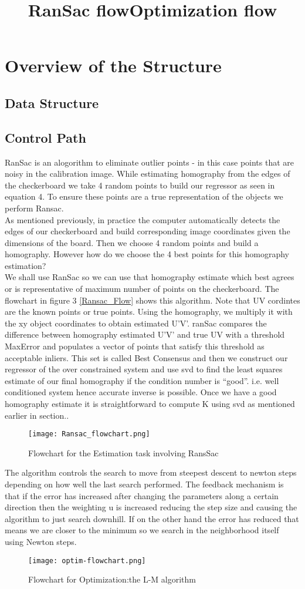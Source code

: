 \documentclass[titlepage]{article}
\begin{document}
\section{Overview of the Structure}
\subsection{Data Structure}
\subsection{Control Path}
\title{RanSac flow}
RanSac is an alogorithm to eliminate outlier points - in this case points that are noisy in the calibration image. While estimating homography from the edges of the checkerboard we take 4 random points to build our regressor \Phi as seen in equation 4. To ensure these points are a true representation of the objects we perform Ransac.\\
As mentioned previously, in practice the computer automatically detects the edges of our checkerboard and build corresponding image coordinates given the dimensions of the board.
Then we choose 4 random points and build a homography. However how do we choose the 4 best points for this homography estimation? \\
We shall use RanSac so we can use that homography estimate which best agrees or is representative of maximum number of points on the checkerboard. The flowchart in figure 3 \ref{Ransac_Flow} shows this algorithm. Note that UV cordintes are the known points or true points. Using the homography, we multiply it with the xy object coordinates to obtain estimated U’V’. ranSac compares the difference between homography estimated U’V’ and true UV with a threshold MaxError  and populates a vector of points that satisfy this threshold as acceptable inliers. This set is called Best Consensus and then we construct our regressor of the over constrained system and use svd to find the least squares estimate of our final homography if the condition number is “good”. i.e. well conditioned system hence accurate inverse is possible. Once we have a good homography estimate it is straightforward to compute K using svd as mentioned earlier in section..
\begin{wrapfigure}{r}{5.5cm}
  \label{Ransac_Flow}
  \caption{Flowchart for the Estimation task involving RansSac}\label{wrap-fig:1}
  \texttt{[image: Ransac\_flowchart.png]}
\end{wrapfigure} 
\title{Optimization flow}
The algorithm controls the search to move from steepest descent to newton steps depending on how well the last search performed. The feedback mechanism is that if the error has increased after changing the parameters along a certain direction then the weighting u is increased reducing the step size and causing the algorithm to just search downhill. If on the other hand the error has reduced that means we are closer to the minimum so we search in the neighborhood itself using Newton steps.
\begin{wrapfigure}{r}{5.5cm}
  \label{Optim_Flow}
  \caption{Flowchart for Optimization:the L-M algorithm}\label{wrap-fig:1}
  \texttt{[image: optim-flowchart.png]}
\end{wrapfigure} 
\end{document}
